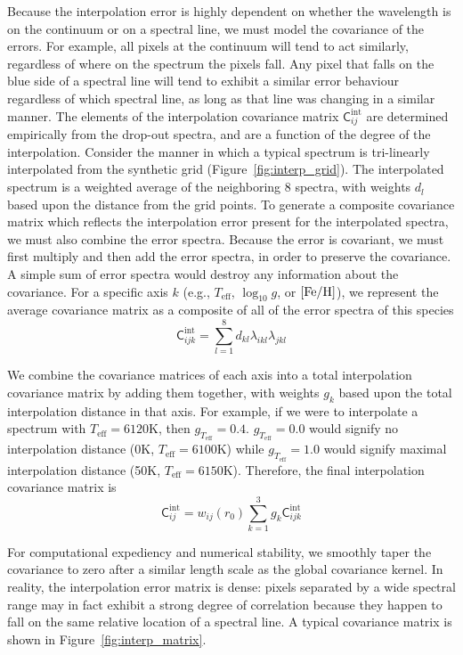 \documentclass[iop,floatfix]{emulateapj}
\newcommand{\Z}{[{\rm Fe}/{\rm H}]}
\begin{document}
Because the interpolation error is highly dependent on whether the wavelength is on the continuum or on a spectral line, we must model the covariance of the errors. For example, all pixels at the continuum will tend to act similarly, regardless of where on the spectrum the pixels fall. Any pixel that falls on the blue side of a spectral line will tend to exhibit a similar error behaviour regardless of which spectral line, as long as that line was changing in a similar manner. The elements of the interpolation covariance matrix $\mathsf{C}_{ij}^\textrm{int}$ are determined empirically from the drop-out spectra, and are a function of the degree of the interpolation. Consider the manner in which a typical spectrum is tri-linearly interpolated from the synthetic grid (Figure~\ref{fig:interp_grid}). The interpolated spectrum is a weighted average of the neighboring 8 spectra, with weights $d_l$ based upon the distance from the grid points. To generate a composite covariance matrix which reflects the interpolation error present for the interpolated spectra, we must also combine the error spectra. Because the error is covariant, we must first multiply and then add the error spectra, in order to preserve the covariance. A simple sum of error spectra would destroy any information about the covariance. For a specific axis $k$ (e.g., $T_\textrm{eff}$, $\log_{10} g$, or $\Z$), we represent the average covariance matrix as a composite of all of the error spectra of this species
\begin{equation}
  \mathsf{C}_{ijk}^\textrm{int} = \sum_{l=1}^8  d_{kl} \lambda_{ikl} \lambda_{jkl}
\end{equation}

We combine the covariance matrices of each axis into a total interpolation covariance matrix by adding them together, with weights $g_k$ based upon the total interpolation distance in that axis. For example, if we were to interpolate a spectrum with $T_\textrm{eff} = 6120$K, then $g_{T_\textrm{eff}} = 0.4$. $g_{T_\textrm{eff}} = 0.0$ would signify no interpolation distance (0K, $T_\textrm{eff} = 6100$K) while $g_{T_\textrm{eff}} = 1.0$ would signify maximal interpolation distance (50K, $T_\textrm{eff} = 6150$K). Therefore, the final interpolation covariance matrix is
\begin{equation}
  \mathsf{C}_{ij}^\textrm{int} = w_{ij}(r_0) \sum_{k=1}^3 g_k \mathsf{C}_{ijk}^\textrm{int}
\end{equation}

For computational expediency and numerical stability, we smoothly taper the covariance to zero after a similar length scale as the global covariance kernel. In reality, the interpolation error matrix is dense: pixels separated by a wide spectral range may in fact exhibit a strong degree of correlation because they happen to fall on the same relative location of a spectral line. A typical covariance matrix is shown in Figure~\ref{fig:interp_matrix}.
\end{document}
